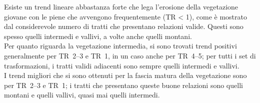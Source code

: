 Esiste un trend lineare abbastanza forte che lega l'erosione della vegetazione giovane con le piene che avvengono frequentemente (TR \SI{< 1}{\anno}), come è mostrato dal considerevole numero di tratti che presentano relazioni valide.
Questi sono spesso quelli intermedi e vallivi, a volte anche quelli montani.
\\
Per quanto riguarda la vegetazione intermedia, si sono trovati trend positivi generalmente per TR~\SIrange[range-phrase = {-}, range-units = single]{2}{3}{\mesi} e TR~\SI{1}{\anno}, in un caso anche per TR~\SIrange[range-phrase = {-}, range-units = single]{4}{5}{\mesi}; per tutti i set di trasformazioni, i tratti validi adiacenti sono sempre quelli intermedi e vallivi.
\\
I trend migliori che si sono ottenuti per la fascia matura della vegetazione sono per TR~\SIrange[range-phrase = {-}, range-units = single]{2}{3}{\mesi} e TR~\SI{1}{\anno}; i tratti che presentano queste buone relazioni sono quelli montani e quelli vallivi, quasi mai quelli intermedi.

